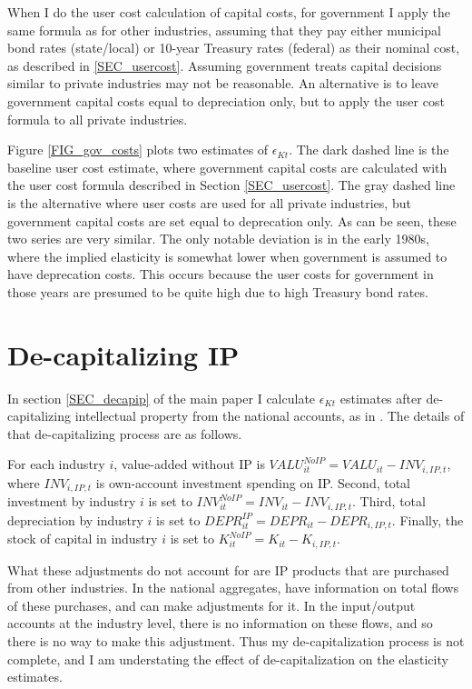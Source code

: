 \documentclass[11pt]{article}
\begin{document}
When I do the user cost calculation of capital costs, for government I apply the same formula as for other industries, assuming that they pay either municipal bond rates (state/local) or 10-year Treasury rates (federal) as their nominal cost, as described in \ref{SEC_usercost}. Assuming government treats capital decisions similar to private industries may not be reasonable. An alternative is to leave government capital costs equal to depreciation only, but to apply the user cost formula to all private industries.

Figure \ref{FIG_gov_costs} plots two estimates of $\epsilon_{Kt}$. The dark dashed line is the baseline user cost estimate, where government capital costs are calculated with the user cost formula described in Section \ref{SEC_usercost}. The gray dashed line is the alternative where user costs are used for all private industries, but government capital costs are set equal to deprecation only. As can be seen, these two series are very similar. The only notable deviation is in the early 1980s, where the implied elasticity is somewhat lower when government is assumed to have deprecation costs. This occurs because the user costs for government in those years are presumed to be quite high due to high Treasury bond rates.

\section{De-capitalizing IP}
In section \ref{SEC_decapip} of the main paper I calculate $\epsilon_{Kt}$ estimates after de-capitalizing intellectual property from the national accounts, as in \cite{ksz2020}. The details of that de-capitalizing process are as follows.

For each industry $i$, value-added without IP is $VALU_{it}^{NoIP} = VALU_{it} - INV_{i,IP,t}$, where $INV_{i,IP,t}$ is own-account investment spending on IP. Second, total investment by industry $i$ is set to $INV_{it}^{NoIP} = INV_{it} - INV_{i,IP,t}$. Third, total depreciation by industry $i$ is set to $DEPR_{it}^{IP} = DEPR_{it} - DEPR_{i,IP,t}$. Finally, the stock of capital in industry $i$ is set to $K^{NoIP}_{it} = K_{it} - K_{i,IP,t}$. 

What these adjustments do not account for are IP products that are purchased from other industries. In the national aggregates, \cite{ksz2020} have information on total flows of these purchases, and can make adjustments for it. In the input/output accounts at the industry level, there is no information on these flows, and so there is no way to make this adjustment. Thus my de-capitalization process is not complete, and I am understating the effect of de-capitalization on the elasticity estimates.
\end{document}

